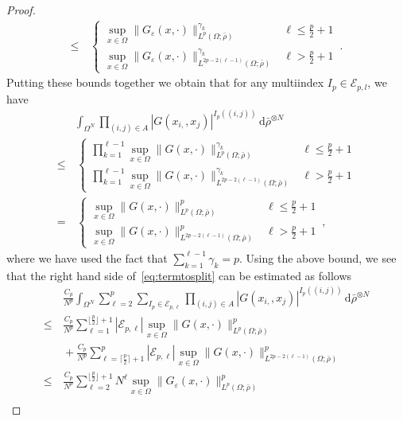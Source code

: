 \documentclass[10pt,a4paper]{amsart}
\newcommand{\eps}{\varepsilon}
\begin{document}
\begin{proof}
\begin{align}
 \leq &  \,
 \begin{cases}
  \displaystyle\sup_{x \in \Omega} \lVert  G_{\eps}(x,\cdot)\rVert_{L^p(\Omega;\bar\rho)}^{\gamma_k} & \ell \leq \frac p2 +1 \\
  \displaystyle \sup_{x \in \Omega} \lVert  G_{\eps}(x,\cdot)\rVert_{L^{2p-2(\ell-1)}(\Omega;\bar\rho)}^{\gamma_k} & \ell > \frac p2 +1
 \end{cases}
 \, .
\end{align}
Putting these bounds together we obtain that for any multiindex $I_p\in \mathcal{E}_{p,l}$, we have
\begin{align}
    &\int_{\Omega^N}\prod_{(i,j)\in A}|G(x_{i,},x_{j})|^{I_p((i,j))}\,\mathrm{{d}}\bar\rho^{\otimes N}\\\le & \,  \begin{cases}\displaystyle
  \prod_{k=1}^{\ell-1}\sup_{x \in \Omega} \lVert  G(x,\cdot)\rVert_{L^p(\Omega;\bar\rho)}^{\gamma_k} & \ell \leq \frac p2 +1 \\
  \displaystyle\prod_{k=1}^{\ell-1}\sup_{x \in \Omega} \lVert  G(x,\cdot)\rVert_{L^{2p-2(\ell-1)}(\Omega;\bar\rho)}^{\gamma_k} & \ell > \frac p2 +1
  \end{cases}\\
  =& \,\begin{cases}\displaystyle
  \sup_{x \in \Omega} \lVert  G(x,\cdot)\rVert_{L^p(\Omega;\bar\rho)}^{p} & \ell \leq \frac p2 +1 \\
  \displaystyle\sup_{x \in \Omega} \lVert  G(x,\cdot)\rVert_{L^{2p-2(\ell-1)}(\Omega;\bar\rho)}^{p} & \ell > \frac p2 +1
    \end{cases}\, ,
\end{align}
where we have used the fact that $\sum_{k=1}^{\ell-1}\gamma_k=p$.
Using the above bound, we see that the right hand side of~\eqref{eq:termtosplit} can be estimated as follows
\begin{align}
& \,\frac{{C_p}}{N^{p}}\int_{\Omega^N}\sum_{\ell=2}^p\sum_{I_{p}\in\mathcal{{E}}_{p,\ell}}\prod_{(i,j)\in A}|G(x_{i,},x_{j})|^{I_p((i,j))}\,\mathrm{{d}}\bar\rho^{\otimes N} \\
\leq & \, \frac{C_p}{N^{p}} \sum_{\ell=1}^{\lfloor\frac p2\rfloor +1}|\mathcal{E}_{p,\ell}| \sup_{x \in \Omega} \lVert  G(x,\cdot)\rVert_{L^p(\Omega;\bar\rho)}^{p}\\
& \, + \frac{C_p}{N^{p}} \sum_{\ell=\lceil\frac p2\rceil +1}^{p}|\mathcal{E}_{p,\ell}| \sup_{x \in \Omega} \lVert  G(x,\cdot)\rVert_{L^{2p-2(\ell-1)}(\Omega;\bar\rho)}^{p}\\
\leq & \, \frac{{C_p}}{N^{p}} \sum_{\ell=2}^{\lfloor\frac p2\rfloor +1} N^{\ell}\sup_{x \in \Omega} \lVert  G_{\eps}(x,\cdot)\rVert_{L^p(\Omega;\bar\rho)}^{p}\\

\end{align}
\end{proof}
\end{document}
